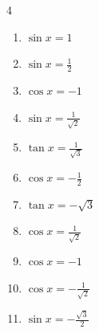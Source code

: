 \begin{multicols}{4}
\begin{enumerate}
  \item $\displaystyle \sin{x}  = 1$


\columnbreak %

\resetques

  \item $\displaystyle \sin{x}  = \frac{1}{2}$


  \item $\displaystyle \cos{x}  = -1$

        \phantom{$\displaystyle x = \pi$}

  \item $\displaystyle \sin{x}  = \frac{1}{\sqrt{2}}$


  \item $\displaystyle \tan{x}  = \frac{1}{\sqrt{3}}$


  \item $\displaystyle \cos{x}  = -\frac{1}{2}$


  \item $\displaystyle \tan{x}  = -\sqrt{3}$


  \item $\displaystyle \cos{x}  = \frac{1}{\sqrt{2}}$


  \item $\displaystyle \cos{x}  = -1$

        \phantom{$\displaystyle x = \pi$}

  \item $\displaystyle \cos{x}  = -\frac{1}{\sqrt{2}}$


  \item $\displaystyle \sin{x}  = -\frac{\sqrt{3}}{2}$



\end{enumerate}
\end{multicols}
